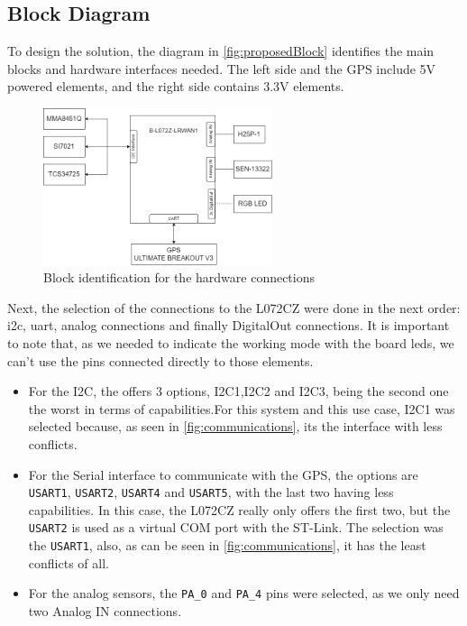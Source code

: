 \subsection{Block Diagram}
To design the solution, the diagram in \autoref{fig:proposedBlock} identifies the main blocks and hardware interfaces needed. The left side and the GPS include 5V powered elements, and the right side contains 3.3V elements.
\begin{figure}[H]
    \centering
    \includegraphics[width=0.6\textwidth]{images/3/General.drawio.png}
    \caption{Block identification for the hardware connections}
    \label{fig:proposedBlock}
\end{figure}

Next, the selection of the connections to the L072CZ were done in the next order: \acrshort{i2c}, \acrshort{uart}, analog connections and finally DigitalOut connections. It is important to note that, as we needed to indicate the working mode with the board leds, we can't 
use the pins connected directly to those elements.
\begin{itemize}
    \item For the I2C, the  offers 3 options, I2C1,I2C2 and I2C3, being the second one the worst in terms of capabilities.For this system and this use case, I2C1 was selected because, as seen in \autoref{fig:communications}, its the interface with less conflicts.
    \item For the Serial interface to communicate with the GPS, the options are \texttt{USART1}, \texttt{USART2}, \texttt{USART4} and \texttt{USART5}, with the last two having less capabilities. In this case, the L072CZ really only offers the first two, but the \texttt{USART2} 
    is used as a virtual COM port with the ST-Link. The selection was the \texttt{USART1}, also, as can be seen in \autoref{fig:communications}, it has the least conflicts of all.
    \item For the analog sensors, the \texttt{PA\_0} and \texttt{PA\_4} pins were selected, as we only need two Analog IN connections.
\end{itemize}

